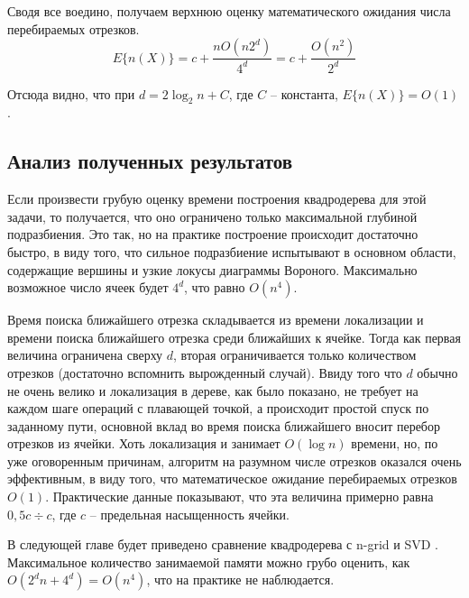 Сводя все воедино, получаем верхнюю оценку математического ожидания числа перебираемых отрезков.
\begin{equation}
E\{n(X)\} = c + \frac{nO(n2^d)}{4^d} = c + \frac{O(n^2)}{2^d}
\end{equation}

Отсюда видно, что при $d = 2\log_2 n + C$, где $C$ -- константа, $E\{n(X)\} = O(1)$.

\FloatBarrier
\subsection{Анализ полученных результатов}
Если произвести грубую оценку времени построения квадродерева для
этой задачи, то получается, что оно ограничено только максимальной глубиной
подразбиения. Это так, но на практике построение происходит достаточно
быстро, в виду того, что сильное подразбиение испытывают в основном
области, содержащие вершины и узкие локусы диаграммы Вороного. 
Максимально возможное число ячеек будет $4^d$, что равно $O(n^4)$.

Время поиска ближайшего отрезка складывается из времени
локализации и времени поиска ближайшего отрезка среди ближайших к
ячейке. Тогда как первая величина ограничена сверху $d$, вторая ограничивается
только количеством отрезков (достаточно вспомнить вырожденный случай).
Ввиду того что $d$ обычно не очень велико и локализация в дереве, как
было показано, не требует на каждом шаге операций с плавающей точкой, 
а происходит простой спуск по заданному пути, основной вклад во время 
поиска ближайшего вносит перебор отрезков из ячейки.
Хоть локализация и занимает $O(\log n)$ времени, но, по уже оговоренным причинам,
алгоритм на разумном числе отрезков оказался очень эффективным, в виду того,
что математическое ожидание перебираемых отрезков $O(1)$. Практические данные
показывают, что эта величина примерно равна $0,5c ÷ c$, где $c$ -- предельная
насыщенность ячейки. 

В следующей главе будет приведено сравнение
квадродерева с n-grid \cite{NGRID} и SVD \cite{CGAL}.
Максимальное количество занимаемой памяти можно грубо оценить, как
$O(2^d n + 4^d) = O(n^4)$, что на практике не наблюдается.

\FloatBarrier

